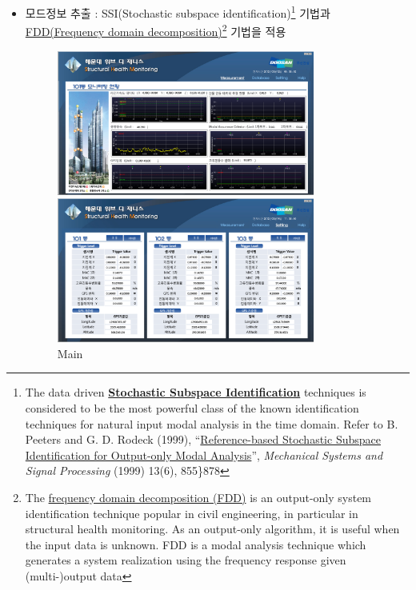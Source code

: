 \begin{itemize}[label=]
\begin{itemize}[label=]
		      \item 모드정보 추출 : SSI(Stochastic subspace identification)\footnote{The data driven \href{http://www.svibs.com/solutions/literature/2006_2.pdf}{\textbf{Stochastic Subspace Identification}} techniques is considered to be the most powerful class of the known identification techniques for natural input modal analysis in the time domain. Refer to B. Peeters and G. D. Rodeck (1999), ``\href{ftp://193.136.28.78/pub/Personal/Dec/filipema/public/FCT_WindOMA/ref_8.pdf}{Reference-based Stochastic Subspace Identification for Output-only Modal Analysis}'', \emph{Mechanical Systems and Signal Processing} (1999) 13(6), 855\}878} 기법과 \href{https://en.wikipedia.org/wiki/Frequency_domain_decomposition}{FDD(Frequency domain decomposition)}\footnote{The \href{https://en.wikipedia.org/wiki/Frequency_domain_decomposition}{frequency domain decomposition (FDD)} is an output-only system identification technique popular in civil engineering, in particular in structural health monitoring. As an output-only algorithm, it is useful when the input data is unknown. FDD is a modal analysis technique which generates a system realization using the frequency response given (multi-)output data} 기법을 적용
		            \begin{figure}[ht]
			            \begin{fullwidth}
				            \parbox{0.8\textwidth}{
					            \includegraphics[width=0.8\textwidth] {images/M3.PNG}
					            \caption*{Main}
				            }\qquad
				            \parbox{0.8\textwidth}{
					            \includegraphics[width=0.8\textwidth] {images/M9.PNG}
}
\end{fullwidth}
\end{figure}
\end{itemize}
\end{itemize}
